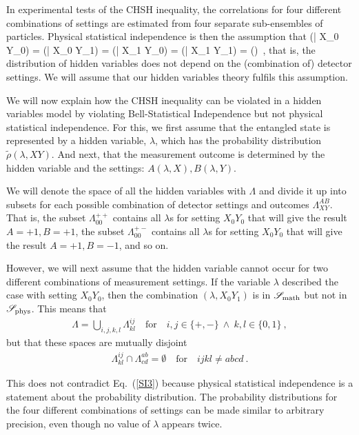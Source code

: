 \documentclass[12pt]{article}
\makeatletter
\newcommand\be{\@ifstar{\[}{\begin{equation}}}
\newcommand\ee{\@ifstar{\]}{\end{equation}}}
\makeatother
\begin{document}
In experimental tests of the {\sc CHSH} inequality, the correlations for four different combinations of settings are estimated from four separate sub-ensembles of particles. 
Physical statistical independence is then the assumption that 
\be
\label{SI3}
\tilde \rho (\lambda | X_0 Y_0) = \tilde \rho(\lambda | X_0 Y_1) = \tilde \rho(\lambda | X_1 Y_0) = \tilde \rho(\lambda | X_1 Y_1) = \tilde \rho(\lambda)~,
\ee
that is, the distribution of hidden variables does not depend on the (combination of) detector settings. We will assume that our hidden variables theory fulfils this assumption.

We will now explain how the {\sc CHSH} inequality can be violated in a hidden variables model by violating Bell-Statistical Independence but not physical statistical independence. For this, we first assume that the entangled state is represented by a hidden variable, $\lambda$, which has the probability distribution $\tilde \rho(\lambda,XY)$. And next, that the measurement outcome is determined by the hidden variable and the settings: $A(\lambda,X), B(\lambda,Y)$.

We will denote the space of all the hidden variables with $\Lambda$ and divide it up into subsets for each possible combination of detector settings and outcomes $\Lambda_{XY}^{AB}$. That is, the subset $\Lambda^{++}_{00}$ contains all $\lambda$s for setting $X_0Y_0$ that will give the result $A=+1,B=+1$, the subset $\Lambda^{+-}_{00}$ contains all $\lambda$s for setting $X_0Y_0$ that will give the result $A=+1,B=-1$, and so on.

However, we will next assume that the hidden variable cannot occur for two different combinations of measurement settings. If the variable $\lambda$ described the case with setting $X_0Y_0$, then the combination $(\lambda,X_0Y_1)$ is in ${\mathscr S}_{\rm math}$ but not in ${\mathscr S}_{\rm phys}$. This means that 
\begin{eqnarray}
\Lambda = \bigcup_{i,j,k,l} \Lambda^{ij}_{kl}\quad \mbox{for} \quad i,j \in \{+,-\}~\wedge~k,l \in \{0,1\}~,
\end{eqnarray}
but that these spaces are mutually disjoint
\begin{eqnarray}
\Lambda^{ij}_{kl} \cap \Lambda^{ab}_{cd} = \emptyset \quad \mbox{for} \quad ijkl \neq abcd~.
\end{eqnarray}

This does not contradict Eq.\ (\ref{SI3}) because physical statistical independence is a statement about the probability distribution. The probability distributions for the four different combinations of settings can be made similar to arbitrary precision, even though no value of $\lambda$ appears twice. 
\end{document}
